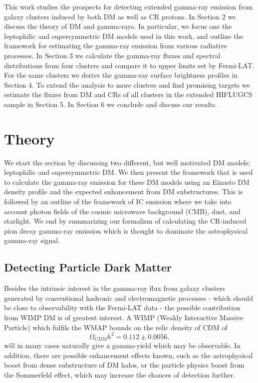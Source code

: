 \documentclass[10pt,aps,pra,reprint,amsmath,amsfonts,amssymb,showpacs,nofootinbib,floatfix]{revtex4-1}
\begin{document}
This work studies the prospects for detecting extended gamma-ray
emission from galaxy clusters induced by both DM as well as CR
protons. In Section 2 we discuss the theory of DM and gamma-rays. In
particular, we focus one the leptophilic and supersymmetric DM models
used in this work, and outline the framework for estimating the
gamma-ray emission from various radiative processes. In Section 3
we calculate the gamma-ray fluxes and spectral distributions from four
clusters and compare it to upper limits set by Fermi-LAT. For the same
clusters we derive the gamma-ray surface brightness profiles in
Section 4. To extend the analysis to more clusters and find
promising targets we estimate the fluxes from DM and CRs of all
clusters in the extended HIFLUGCS sample in Section 5. In Section
6 we conclude and discuss our results.

\section{Theory}
\label{sect:theory}
We start the section by discussing two different, but well motivated
DM models; leptophilic and supersymmetric DM. We then present the
framework that is used to calculate the gamma-ray emission for these
DM models using an Einasto DM density profile and the expected
enhancement from DM substructures. This is followed by an outline of
the framework of IC emission where we take into account photon fields
of the cosmic microwave background (CMB), dust, and starlight. We end
by summarizing our formalism of calculating the CR-induced pion decay
gamma-ray emission which is thought to dominate the astrophysical
gamma-ray signal.


\subsection{Detecting Particle Dark Matter}
\label{sect:PF}
Besides the intrinsic interest in the gamma-ray flux from galaxy
clusters generated by conventional hadronic and electromagnetic
processes - which should be close to observability with the Fermi-LAT
data
\cite{1997ApJ...487..529B,2007A&A...473...41E,2010MNRAS.409..449P} -
the possible contribution from WIMP DM is of greatest interest. A WIMP
(Weakly Interactive Massive Particle) which fulfils the WMAP bounds on
the relic density of CDM of \cite{Komatsu:2010fb}
$$\Omega_{CDM}h^2=0.112\pm 0.0056,$$ will in many cases naturally give
a gamma-yield which may be observable. In addition, there are possible
enhancement effects known, such as the astrophysical boost from dense
substructure of DM halos, or the particle physics boost from the
Sommerfeld effect, which may increase the chances of detection
further.
\end{document}
